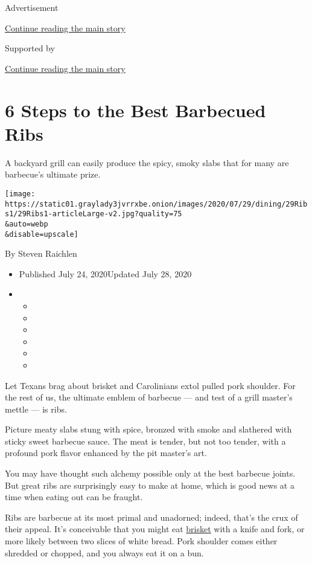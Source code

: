Advertisement

\protect\hyperlink{after-top}{Continue reading the main story}

Supported by

\protect\hyperlink{after-sponsor}{Continue reading the main story}

\hypertarget{6-steps-to-the-best-barbecued-ribs}{%
\section{6 Steps to the Best Barbecued
Ribs}\label{6-steps-to-the-best-barbecued-ribs}}

A backyard grill can easily produce the spicy, smoky slabs that for many
are barbecue's ultimate prize.

\texttt{[image: https://static01.graylady3jvrrxbe.onion/images/2020/07/29/dining/29Ribs1/29Ribs1-articleLarge-v2.jpg?quality=75\\\&auto=webp\\\&disable=upscale]}

By Steven Raichlen

\begin{itemize}
\item
  Published July 24, 2020Updated July 28, 2020
\item
  \begin{itemize}
  \item
  \item
  \item
  \item
  \item
  \item
  \end{itemize}
\end{itemize}

Let Texans brag about brisket and Carolinians extol pulled pork
shoulder. For the rest of us, the ultimate emblem of barbecue --- and
test of a grill master's mettle --- is ribs.

Picture meaty slabs stung with spice, bronzed with smoke and slathered
with sticky sweet barbecue sauce. The meat is tender, but not too
tender, with a profound pork flavor enhanced by the pit master's art.

You may have thought such alchemy possible only at the best barbecue
joints. But great ribs are surprisingly easy to make at home, which is
good news at a time when eating out can be fraught.

Ribs are barbecue at its most primal and unadorned; indeed, that's the
crux of their appeal. It's conceivable that you might eat
\href{https://www.nytimes3xbfgragh.onion/2019/05/24/dining/smoked-brisket.html}{brisket}
with a knife and fork, or more likely between two slices of white bread.
Pork shoulder comes either shredded or chopped, and you always eat it on
a bun.

